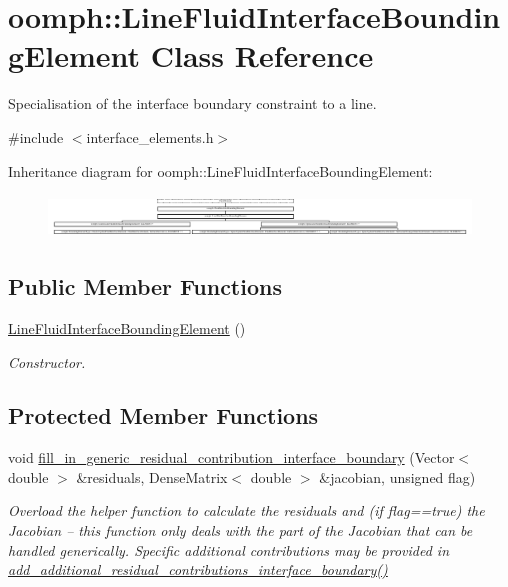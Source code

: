 \hypertarget{classoomph_1_1LineFluidInterfaceBoundingElement}{}\section{oomph\+:\+:Line\+Fluid\+Interface\+Bounding\+Element Class Reference}
\label{classoomph_1_1LineFluidInterfaceBoundingElement}


Specialisation of the interface boundary constraint to a line.  




{\ttfamily \#include $<$interface\+\_\+elements.\+h$>$}

Inheritance diagram for oomph\+:\+:Line\+Fluid\+Interface\+Bounding\+Element\+:\begin{figure}[H]
\begin{center}
\leavevmode
\includegraphics[height=1.138211cm]{classoomph_1_1LineFluidInterfaceBoundingElement}
\end{center}
\end{figure}
\subsection*{Public Member Functions}
\begin{DoxyCompactItemize}
\item 
\hyperlink{classoomph_1_1LineFluidInterfaceBoundingElement_a29d14ee44cd9b2db52779ea570850821}{Line\+Fluid\+Interface\+Bounding\+Element} ()
\begin{DoxyCompactList}\small\item\em Constructor. \end{DoxyCompactList}\end{DoxyCompactItemize}
\subsection*{Protected Member Functions}
\begin{DoxyCompactItemize}
\item 
void \hyperlink{classoomph_1_1LineFluidInterfaceBoundingElement_aa162a09ba8dfcba4d81e6abaa7a29986}{fill\+\_\+in\+\_\+generic\+\_\+residual\+\_\+contribution\+\_\+interface\+\_\+boundary} (Vector$<$ double $>$ \&residuals, Dense\+Matrix$<$ double $>$ \&jacobian, unsigned flag)
\begin{DoxyCompactList}\small\item\em Overload the helper function to calculate the residuals and (if flag==true) the Jacobian -- this function only deals with the part of the Jacobian that can be handled generically. Specific additional contributions may be provided in \hyperlink{classoomph_1_1FluidInterfaceBoundingElement_a4510bd81b572d758694715f673080041}{add\+\_\+additional\+\_\+residual\+\_\+contributions\+\_\+interface\+\_\+boundary()} \end{DoxyCompactList}\end{DoxyCompactItemize}
